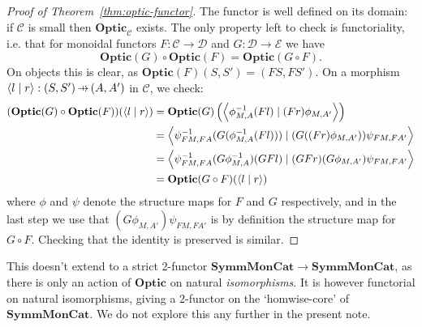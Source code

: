 \documentclass[11pt,letterpaper]{article}
\theoremstyle{plain}
\theoremstyle{definition}
\newcommand{\C}{\mathscr{C}}
\newcommand{\D}{\mathscr{D}}
\newcommand{\E}{\mathscr{E}}
\newcommand{\SymmMonCat}{\mathbf{SymmMonCat}}
\newcommand{\Optic}{\mathbf{Optic}}
\newcommand{\rep}[2]{{\ensuremath \left\langle #1 \mid #2 \right\rangle}}
\newcommand{\hto}{\ensuremath{\,\mathaccent\shortmid\rightarrow\,}}
\begin{document}
\begin{proof}[Proof of Theorem~\ref{thm:optic-functor}]
The functor is well defined on its domain: if $\C$ is small then $\Optic_\C$ exists. The only property left to check is functoriality, i.e. that for monoidal functors $F : \C \to \D$ and $G : \D \to \E$ we have
\[ \Optic(G) \circ \Optic(F) = \Optic(G \circ F).\]
On objects this is clear, as $\Optic(F)(S, S') = (FS, FS')$. On a morphism $\rep{l}{r} : (S, S') \hto (A, A')$ in $\C$, we check:
\begin{align*}
(\Optic(G) \circ \Optic(F))(\rep{l}{r})
&= \Optic(G) \left(\rep{\phi^{-1}_{M,A} (Fl)}{(Fr) \phi_{M,A'}}\right) \\
&= \rep{\psi^{-1}_{FM,FA} (G(\phi^{-1}_{M,A} (Fl)))}{(G((Fr) \phi_{M,A'}))\psi_{FM,FA'}} \\
&= \rep{\psi^{-1}_{FM,FA} (G\phi^{-1}_{M,A}) (GFl)}{(GFr) (G\phi_{M,A'})\psi_{FM,FA'}} \\
&=\Optic(G \circ F)(\rep{l}{r})
\end{align*}
where $\phi$ and $\psi$ denote the structure maps for $F$ and $G$ respectively, and in the last step we use that $(G\phi_{M,A'})\psi_{FM,FA'}$ is by definition the structure map for $G \circ F$. Checking that the identity is preserved is similar.
%
%
\end{proof}

This doesn't extend to a strict 2-functor $\SymmMonCat \to \SymmMonCat$, as there is only an action of $\Optic$ on natural \emph{isomorphisms}. It is however functorial on natural isomorphisms, giving a 2-functor on the `homwise-core' of $\SymmMonCat$. We do not explore this any further in the present note.
\end{document}
